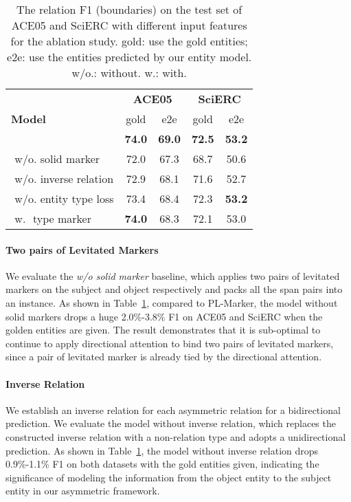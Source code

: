 \documentclass[11pt]{article}
\newcommand\Ourmodel{PL-Marker\xspace}
\begin{document}
\begin{table}[!t]
\small


\centering
\begin{tabular}{l|cc|cc}
\toprule
\multirow{3}{*}{\textbf{Model}} & \multicolumn{2}{c|}{\textbf{ACE05}} & \multicolumn{2}{c}{\textbf{SciERC}} \\
 & gold & e2e  & gold & e2e \\
\midrule
\Ourmodel &  \textbf{74.0}  & \textbf{69.0} & \textbf{72.5}  & \textbf{53.2} \\
\,\,w/o. solid marker  & 72.0 & 67.3 & 68.7 &  50.6  \\
\,\,w/o. inverse relation  & 72.9  &  68.1  &  71.6 & 52.7    \\
\,\,w/o. entity type loss  &  73.4 & 68.4  & 72.3  &  \textbf{53.2} \\
\,\,w.\,\, type marker &\textbf{74.0}& 68.3& 72.1 & 53.0 \\
\bottomrule
\end{tabular}
 \caption{The relation F1 (boundaries) on the test set of ACE05 and SciERC with different input features for the ablation study. gold: use the gold entities; e2e: use the entities predicted by our entity model. w/o.: without. w.: with.}
\label{tab:ablation_re}
\end{table}

\paragraph{Two pairs of Levitated Markers}
We evaluate the \emph{w/o solid marker} baseline, which applies two pairs of levitated markers on the subject and object respectively and packs all the span pairs into an instance. 
As shown in Table~\ref{tab:ablation_re}, compared to \Ourmodel, the model without solid markers drops a huge 2.0\%-3.8\% F1 on ACE05 and SciERC when the golden entities are given. The result demonstrates that it is sub-optimal to continue to apply directional attention to bind two pairs of levitated markers, since a pair of levitated marker is already tied by the   directional attention.

\paragraph{Inverse Relation} We establish an inverse relation for each asymmetric relation for a bidirectional prediction.  We evaluate the model without inverse relation, which replaces the constructed inverse relation with a non-relation type and adopts a unidirectional prediction.
As shown in  Table~\ref{tab:ablation_re}, the model without inverse relation drops 0.9\%-1.1\% F1  on both datasets with the gold entities given,  indicating the significance of modeling the information from the object entity to the subject entity in our asymmetric framework.  
\end{document}
